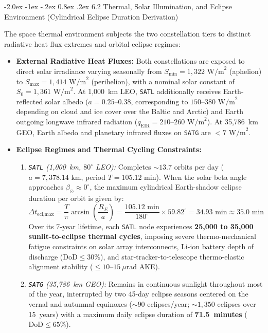 \documentclass[11pt,a4paper]{article}
\makeatletter
\renewcommand\subsubsection{\@startsection{subsubsection}{3}{\z@}%
    {-2.0ex \@plus -1ex \@minus -.2ex}%
    {0.8ex \@plus .2ex}%
    {\normalfont\normalsize\bfseries\sffamily\color{SubHeadingBlue}}}
\providecommand{\abbr}[1]{#1}
\makeatother
\begin{document}
\subsubsection{6.2 Thermal, Solar Illumination, and Eclipse Environment (Cylindrical Eclipse Duration Derivation)}

The space thermal environment subjects the two constellation tiers to distinct radiative heat flux extremes and orbital eclipse regimes:
\begin{itemize}
    \item \textbf{External Radiative Heat Fluxes:} Both constellations are exposed to direct solar irradiance varying seasonally from $S_{\min} = 1{,}322\text{ W/m}^2$ (aphelion) to $S_{\max} = 1{,}414\text{ W/m}^2$ (perihelion), with a nominal solar constant of $S_0 = 1{,}361\text{ W/m}^2$. At 1,000~km \abbr{LEO}, \texttt{SATL} additionally receives Earth-reflected solar albedo ($a = 0.25\text{--}0.38$, corresponding to $150\text{--}380\text{ W/m}^2$ depending on cloud and ice cover over the Baltic and Arctic) and Earth outgoing longwave infrared radiation ($q_{\text{EIR}} = 210\text{--}260\text{ W/m}^2$). At 35,786~km \abbr{GEO}, Earth albedo and planetary infrared fluxes on \texttt{SATG} are $< 7\text{ W/m}^2$.
    \item \textbf{Eclipse Regimes and Thermal Cycling Constraints:}
    \begin{enumerate}
        \item \emph{\texttt{SATL} (1,000~km, $80^\circ$ \abbr{LEO}):} Completes $\sim 13.7$ orbits per day ($a = 7{,}378.14\text{ km}$, period $T = 105.12\text{ min}$). When the solar beta angle approaches $\beta_{\odot} \approx 0^\circ$, the maximum cylindrical Earth-shadow eclipse duration per orbit is given by:
        \[
            \Delta t_{\text{ecl,max}} = \frac{T}{\pi}\arcsin\!\left(\frac{R_E}{a}\right) = \frac{105.12\text{ min}}{180^\circ} \times 59.82^\circ = 34.93\text{ min} \approx 35.0\text{ min}
        \]
        Over its 7-year lifetime, each \texttt{SATL} node experiences \textbf{25,000 to 35,000 sunlit-to-eclipse thermal cycles}, imposing severe thermo-mechanical fatigue constraints on solar array interconnects, $\mathrm{Li\text{-}ion}$ battery depth of discharge ($\text{DoD} \le 30\%$), and star-tracker-to-telescope thermo-elastic alignment stability ($\le 10\text{--}15~\mu\mathrm{rad}$ \abbr{AKE}).
        \item \emph{\texttt{SATG} (35,786~km \abbr{GEO}):} Remains in continuous sunlight throughout most of the year, interrupted by two 45-day eclipse seasons centered on the vernal and autumnal equinoxes ($\sim 90$ eclipses/year; $\sim 1{,}350$ eclipses over 15~years) with a maximum daily eclipse duration of \textbf{71.5~minutes} ($\text{DoD} \le 65\%$).

\end{enumerate}
\end{itemize}
\end{document}
